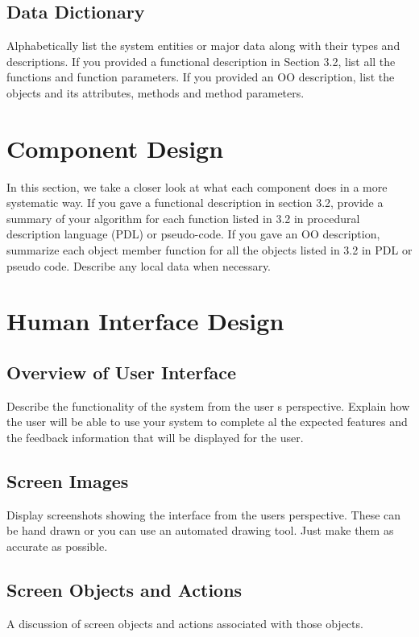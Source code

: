 \documentclass[12pt]{article}
\begin{document}
\subsection {Data Dictionary}
Alphabetically list the system entities or major data along with their types and descriptions. If
you  provided  a  functional description  in  Section 3.2, list all the  functions and function 
parameters. If you provided an OO description, list the objects and its attributes, methods and 
method parameters.

\section{Component Design}
In this section, we take a closer look at what each component does in a more systematic way. If you gave a functional description in section 3.2, provide a summary of your algorithm for each 
function listed in 3.2 in procedural description language (PDL) or pseudo-code. If you gave an 
OO description, summarize each object member function for all the objects listed in 3.2 in PDL
or pseudo code. Describe any local data when necessary.


\section{Human Interface Design}

\subsection {Overview of User Interface}
Describe the functionality of the system from the user s perspective. Explain  how the user 
will be  able  to use  your system to complete  al the  expected  features and  the  feedback 
information that will be displayed for the user.

\subsection {Screen Images}
Display screenshots showing the interface from the users perspective. These can be  hand drawn
or you can use an automated drawing tool. Just make them as accurate as possible.



\subsection {Screen Objects and Actions}
A discussion of screen objects and actions associated with those objects.
\end{document}
